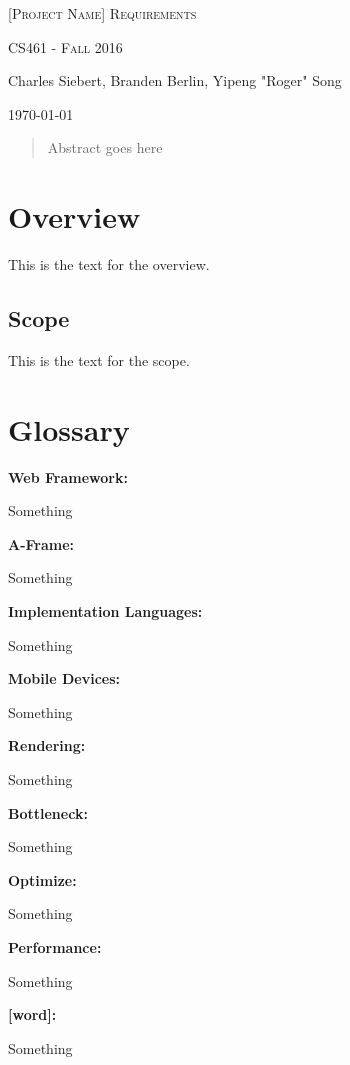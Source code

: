 \documentclass[letterpaper,10pt,titlepage,draftclsnofoot,onecolumn,compsoc,utf8,latin1]{IEEEtran}
\def\name{Charles Siebert, Branden Berlin, Yipeng "Roger" Song}
\begin{document}
\begin{titlepage}
\centering
\vspace*{4cm}
{\scshape\LARGE [Project Name] Requirements } \\
	{\scshape\Large CS461 - Fall 2016 \par}
	\vspace{.5cm}
	\name \par
    {\large \today \par} 
    
	\vspace*{1cm}
	
\begin{abstract}
Abstract goes here
\end{abstract}

\end{titlepage}

\tableofcontents
\newpage
\section{Overview}
\noindent
This is the text for the overview.

\subsection{Scope}
\noindent
This is the text for the scope.

\section{Glossary}
\begin{enumerate}
    {\item \bfseries Web Framework: } Something
    {\item \bfseries A-Frame: } Something
    {\item \bfseries Implementation Languages: } Something
    {\item \bfseries Mobile Devices: } Something
    {\item \bfseries Rendering: } Something
    {\item \bfseries Bottleneck: } Something
    {\item \bfseries Optimize: } Something
    {\item \bfseries Performance: } Something
    {\item \bfseries [word]: } Something
\end{enumerate}
\end{document}
